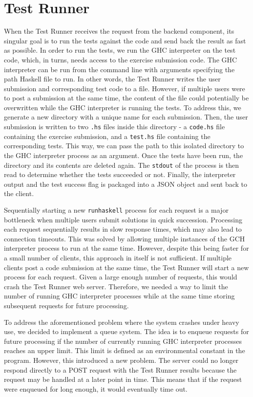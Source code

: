 \chapter{Test Runner} \label{chap:TestRunner}
When the Test Runner receives the request from the backend component, its singular goal is to run the tests against the code and send back the result as fast as possible.
In order to run the tests, we run the GHC interpreter on the test code, which, in turns, needs access to the exercise submission code.
The GHC interpreter can be run from the command line with arguments specifying the path Haskell file to run.
In other words, the Test Runner writes the user submission and corresponding test code to a file.
However, if multiple users were to post a submission at the same time, the content of the file could potentially be overwritten while the GHC interpreter is running the tests.
To address this, we generate a new directory with a unique name for each submission.
Then, the user submission is written to two  \texttt{.hs} files inside this directory - a \texttt{code.hs} file containing the exercise submission, and a \texttt{test.hs} file containing the corresponding tests.
This way, we can pass the path to this isolated directory to the GHC interpreter process as an argument.
Once the tests have been run, the directory and its contents are deleted again.
The \texttt{stdout} of the process is then read to determine whether the tests succeeded or not.
Finally, the interpreter output and the test success flag is packaged into a JSON object and sent back to the client.

Sequentially starting a new \texttt{runhaskell} process for each request is a major bottleneck when multiple users submit solutions in quick succession.
Processing each request sequentially results in slow response times, which may also lead to connection timeouts.
This was solved by allowing multiple instances of the GCH interpreter process to run at the same time.
However, despite this being faster for a small number of clients, this approach in itself is not sufficient.
If multiple clients post a code submission at the same time, the Test Runner will start a new process for each request.
Given a large enough number of requests, this would crash the Test Runner web server.
Therefore, we needed a way to limit the number of running GHC interpreter processes while at the same time storing subsequent requests for future processing.

To address the aforementioned problem where the system crashes under heavy use, we decided to implement a queue system.
The idea is to enqueue requests for future processing if the number of currently running GHC interpreter processes reaches an upper limit.
This limit is defined as an environmental constant in the program.
However, this introduced a new problem.
The server could no longer respond directly to a POST request with the Test Runner results because the request may be handled at a later point in time.
This means that if the request were enqueued for long enough, it would eventually time out.



